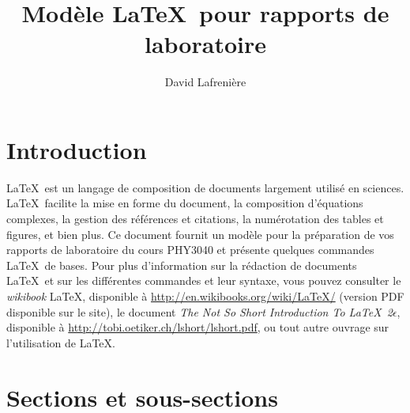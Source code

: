 \documentclass[10pt,letterpaper,twocolumn]{article}
\title{\vspace{-10mm}\Large
Modèle \LaTeX\ pour rapports de laboratoire %
\vspace{-4mm}}
\author{\large
David Lafrenière %
}
\date{\vspace{-8mm}}
\begin{document}

\section{Introduction}\label{intro}

\LaTeX\ est un langage de composition de documents largement utilisé en sciences. \LaTeX\ facilite la mise en forme du document, la composition d'équations complexes, la gestion des références et citations, la numérotation des tables et figures, et bien plus. Ce document fournit un modèle pour la préparation de vos rapports de laboratoire du cours PHY3040 et présente quelques commandes \LaTeX\ de bases. Pour plus d'information sur la rédaction de documents \LaTeX\ et sur les différentes commandes et leur syntaxe, vous pouvez consulter le {\em wikibook} \LaTeX, disponible à \url{http://en.wikibooks.org/wiki/LaTeX/} (version PDF disponible sur le site), le document {\em The Not So Short Introduction To \LaTeX\ 2$\epsilon$}, disponible à \url{http://tobi.oetiker.ch/lshort/lshort.pdf}, ou tout autre ouvrage sur l'utilisation de \LaTeX.

\section{Sections et sous-sections}
\end{document}

